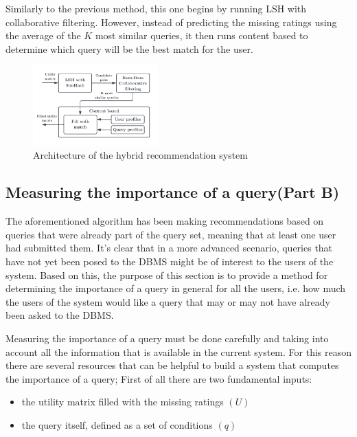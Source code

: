 Similarly to the previous method, this one begins by running LSH with collaborative filtering. However, instead of predicting the missing ratings using the average of the $K$ most similar queries, it then runs content based to determine which query will be the best match for the user. 


\begin{figure}[h]
    \centering
    \includegraphics[width=0.43\textwidth]{imgs/hybrid_diagram.pdf}
    \caption{\normalfont Architecture of the hybrid recommendation system}
    \label{fig:hybrid}
\end{figure}




\subsection{Measuring the importance of a query(Part B)}

The aforementioned algorithm has been making recommendations based on queries that were already part of the query set, meaning that at least one user had submitted them. It's clear that in a more advanced scenario, queries that have not yet been posed to the DBMS might be of interest to the users of the system. Based on this, the purpose of this section is to provide a method for determining the importance of a query in general for all the users, i.e. how much the users of the system would like a query that may or may not have already been asked to the DBMS. 

Measuring the importance of a query must be done carefully and taking into account all the information that is available in the current system. For this reason there are several resources that can be helpful to build a system that computes the importance of a query; First of all there are two fundamental inputs:
\begin{itemize}
    \item the utility matrix filled with the missing ratings $(U)$
    \item the query itself, defined as a set of conditions $(q)$
\end{itemize}

